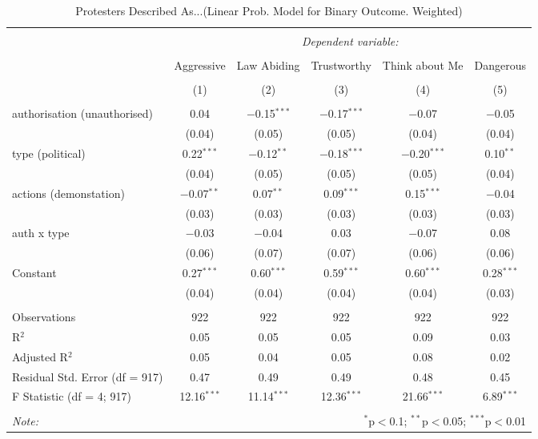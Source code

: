 
\begin{table}[!htbp] \centering 
  \caption{Protesters Described As...(Linear Prob. Model for Binary Outcome. Weighted)} 
  \label{} 
\begin{tabular}{@{\extracolsep{5pt}}lccccc} 
\\[-1.8ex]\hline 
\hline \\[-1.8ex] 
 & \multicolumn{5}{c}{\textit{Dependent variable:}} \\ 
\cline{2-6} 
\\[-1.8ex] & Aggressive & Law Abiding & Trustworthy & Think about Me & Dangerous \\ 
\\[-1.8ex] & (1) & (2) & (3) & (4) & (5)\\ 
\hline \\[-1.8ex] 
 authorisation (unauthorised) & 0.04 & $-$0.15$^{***}$ & $-$0.17$^{***}$ & $-$0.07 & $-$0.05 \\ 
  & (0.04) & (0.05) & (0.05) & (0.04) & (0.04) \\ 
  type (political) & 0.22$^{***}$ & $-$0.12$^{**}$ & $-$0.18$^{***}$ & $-$0.20$^{***}$ & 0.10$^{**}$ \\ 
  & (0.04) & (0.05) & (0.05) & (0.05) & (0.04) \\ 
  actions (demonstation) & $-$0.07$^{**}$ & 0.07$^{**}$ & 0.09$^{***}$ & 0.15$^{***}$ & $-$0.04 \\ 
  & (0.03) & (0.03) & (0.03) & (0.03) & (0.03) \\ 
  auth x type & $-$0.03 & $-$0.04 & 0.03 & $-$0.07 & 0.08 \\ 
  & (0.06) & (0.07) & (0.07) & (0.06) & (0.06) \\ 
  Constant & 0.27$^{***}$ & 0.60$^{***}$ & 0.59$^{***}$ & 0.60$^{***}$ & 0.28$^{***}$ \\ 
  & (0.04) & (0.04) & (0.04) & (0.04) & (0.03) \\ 
 \hline \\[-1.8ex] 
Observations & 922 & 922 & 922 & 922 & 922 \\ 
R$^{2}$ & 0.05 & 0.05 & 0.05 & 0.09 & 0.03 \\ 
Adjusted R$^{2}$ & 0.05 & 0.04 & 0.05 & 0.08 & 0.02 \\ 
Residual Std. Error (df = 917) & 0.47 & 0.49 & 0.49 & 0.48 & 0.45 \\ 
F Statistic (df = 4; 917) & 12.16$^{***}$ & 11.14$^{***}$ & 12.36$^{***}$ & 21.66$^{***}$ & 6.89$^{***}$ \\ 
\hline 
\hline \\[-1.8ex] 
\textit{Note:}  & \multicolumn{5}{r}{$^{*}$p$<$0.1; $^{**}$p$<$0.05; $^{***}$p$<$0.01} \\ 
\end{tabular} 
\end{table} 

